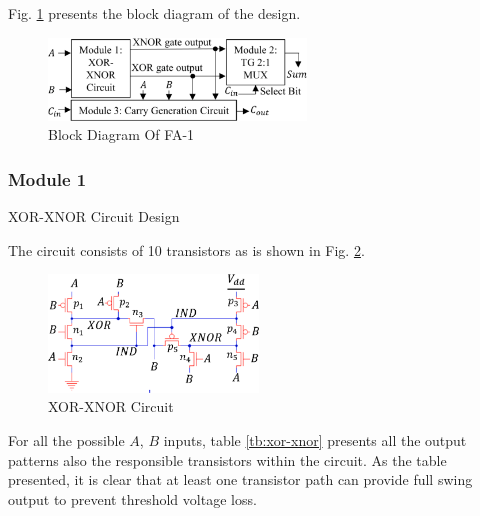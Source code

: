 \documentclass[conference]{IEEEtran}
\begin{document}
Fig. \ref{fig:fa1-bd} presents the block diagram of the design.

\begin{figure}[!ht]
	\centering
	\includegraphics[width=2.7in]{fa1-block diagram.png}
	\caption{Block Diagram Of FA-1}
	\label{fig:fa1-bd}
\end{figure}

\subsubsection{Module 1}XOR-XNOR Circuit Design

The circuit consists of 10 transistors as is shown in Fig. \ref{fig:fa1-xor-xnor}.

\begin{figure}[!ht]
	\centering
	\includegraphics[width=2.2in]{fa1-xor-xnor circuit.png}
	\caption{XOR-XNOR Circuit}
	\label{fig:fa1-xor-xnor}
\end{figure}

For all the possible \(A\), \(B\) inputs,
table \ref{tb:xor-xnor} presents all the output patterns also the responsible transistors within the circuit.
As the table presented, it is clear that at least one transistor path can provide full swing output to prevent threshold voltage loss.
\end{document}
